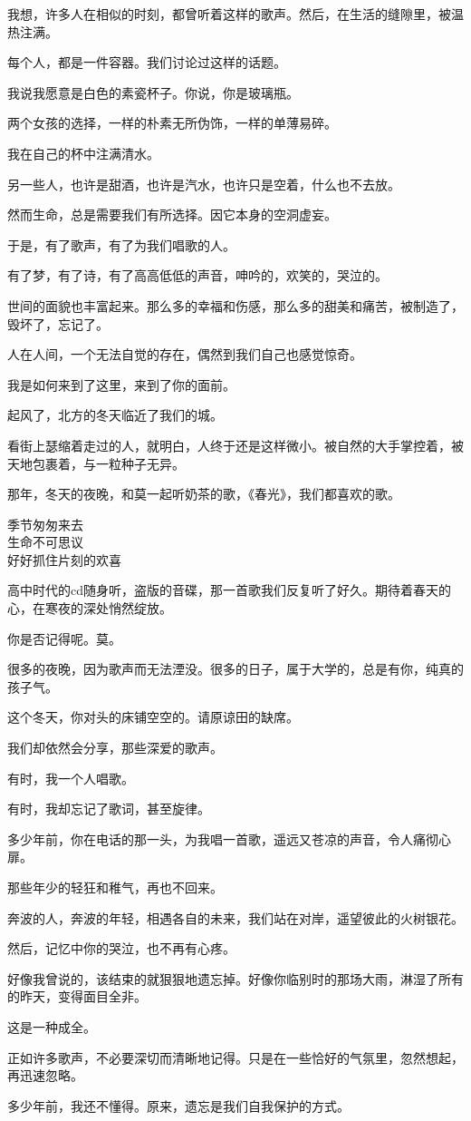 		我想，许多人在相似的时刻，都曾听着这样的歌声。然后，在生活的缝隙里，被温热注满。\par
		每个人，都是一件容器。我们讨论过这样的话题。\par
		我说我愿意是白色的素瓷杯子。你说，你是玻璃瓶。\par
		两个女孩的选择，一样的朴素无所伪饰，一样的单薄易碎。\par
		我在自己的杯中注满清水。\par
		另一些人，也许是甜酒，也许是汽水，也许只是空着，什么也不去放。\par
		然而生命，总是需要我们有所选择。因它本身的空洞虚妄。\par
		于是，有了歌声，有了为我们唱歌的人。\par
		有了梦，有了诗，有了高高低低的声音，呻吟的，欢笑的，哭泣的。\par
		世间的面貌也丰富起来。那么多的幸福和伤感，那么多的甜美和痛苦，被制造了，毁坏了，忘记了。\par
		人在人间，一个无法自觉的存在，偶然到我们自己也感觉惊奇。\par
		我是如何来到了这里，来到了你的面前。

		起风了，北方的冬天临近了我们的城。\par
		看街上瑟缩着走过的人，就明白，人终于还是这样微小。被自然的大手掌控着，被天地包裹着，与一粒种子无异。\par
		那年，冬天的夜晚，和莫一起听奶茶的歌，《春光》，我们都喜欢的歌。

		\longpoem{}{}{}
			季节匆匆来去 \\
			生命不可思议 \\
			好好抓住片刻的欢喜
		\endlongpoem

		高中时代的cd随身听，盗版的音碟，那一首歌我们反复听了好久。期待着春天的心，在寒夜的深处悄然绽放。\par
		你是否记得呢。莫。\par
		很多的夜晚，因为歌声而无法湮没。很多的日子，属于大学的，总是有你，纯真的孩子气。\par
		这个冬天，你对头的床铺空空的。请原谅田的缺席。\par
		我们却依然会分享，那些深爱的歌声。

		有时，我一个人唱歌。\par
		有时，我却忘记了歌词，甚至旋律。

		多少年前，你在电话的那一头，为我唱一首歌，遥远又苍凉的声音，令人痛彻心扉。\par
		那些年少的轻狂和稚气，再也不回来。\par
		奔波的人，奔波的年轻，相遇各自的未来，我们站在对岸，遥望彼此的火树银花。\par
		然后，记忆中你的哭泣，也不再有心疼。\par
		好像我曾说的，该结束的就狠狠地遗忘掉。好像你临别时的那场大雨，淋湿了所有的昨天，变得面目全非。\par
		这是一种成全。\par
		正如许多歌声，不必要深切而清晰地记得。只是在一些恰好的气氛里，忽然想起，再迅速忽略。\par
		多少年前，我还不懂得。原来，遗忘是我们自我保护的方式。


